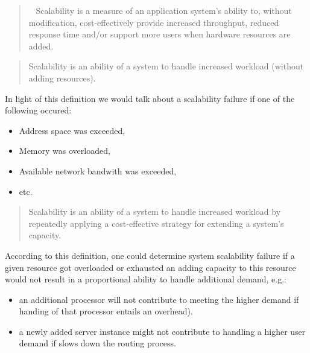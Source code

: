 \documentclass{uvamscse}
\begin{document}
\begin{quote}
~\cite{Williams04} Scalability is a measure of an application system’s ability to, without modification, cost-effectively provide increased throughput, reduced response time and/or support more users when hardware resources are added.
\end{quote}

\begin{quote}
\cite{WeinstockOnSystem2006} Scalability is an ability of a system to handle increased workload (without adding resources).
\end{quote}\label{x}
In light of this definition we would talk about a scalability failure if one of the following occured:
\begin{itemize}
  \item Address space was exceeded,
  \item Memory was overloaded,
  \item Available network bandwith was exceeded,
  \item etc.
\end{itemize}

\begin{quote}
\cite{WeinstockOnSystem2006} Scalability is an ability of a system to handle increased workload by repeatedly applying a cost-effective strategy for extending a system’s capacity.
\end{quote}
According to this definition, one could determine system scalability failure if a given resource got overloaded or exhausted an adding capacity to this resource would not result in a proportional ability to handle additional demand, e.g.:
\begin{itemize}
  \item an additional processor will not contribute to meeting the higher demand if handing of that processor entails an overhead).
  \item a newly added server instance might not contribute to handling a higher user demand if slows down the routing process.
\end{itemize}
\end{document}
